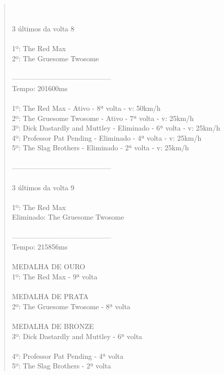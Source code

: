 \documentclass[paper=a4, fontsize=11pt]{scrartcl}
\numberwithin{equation}{section}		%
\numberwithin{figure}{section}			%
\numberwithin{table}{section}				%
\begin{document}
\begin{quote}
\\
\\3 últimos da volta 8
\\
\\1º: The Red Max
\\2º: The Gruesome Twosome
\\
\\------------------------------------------
\\Tempo: 201600ms
\\
\\1º: The Red Max - Ativo - 8ª volta - v: 50km/h
\\2º: The Gruesome Twosome - Ativo - 7ª volta - v: 25km/h
\\3º: Dick Dastardly and Muttley - Eliminado - 6ª volta - v: 25km/h
\\4º: Professor Pat Pending - Eliminado - 4ª volta - v: 25km/h
\\5º: The Slag Brothers - Eliminado - 2ª volta - v: 25km/h
\\
\\------------------------------------------
\\
\\3 últimos da volta 9
\\
\\1º: The Red Max
\\Eliminado: The Gruesome Twosome
\\
\\------------------------------------------
\\Tempo: 215856ms
\\
\\MEDALHA DE OURO
\\1º: The Red Max - 9ª volta
\\
\\MEDALHA DE PRATA
\\2º: The Gruesome Twosome - 8ª volta
\\
\\MEDALHA DE BRONZE
\\3º: Dick Dastardly and Muttley - 6ª volta
\\
\\4º: Professor Pat Pending - 4ª volta
\\5º: The Slag Brothers - 2ª volta
\\
\end{quote}

\end{document}
